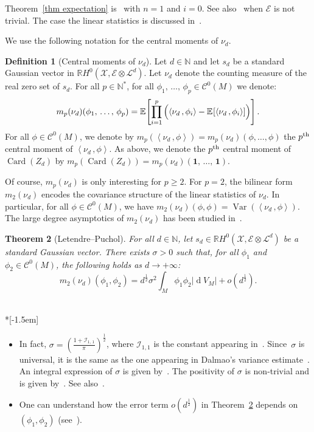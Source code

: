 \documentclass[10pt]{amsart}
\newtheorem{theo}{Theorem}[section]
\theoremstyle{definition}\newtheorem{defi}[theo]{Definition}\newtheorem{rema}[theo]{Remark}\newtheorem{exam}[theo]{Example}\newtheorem{exem}[theo]{Example}\newtheorem{nota}[theo]{Notation}
\DeclareMathOperator{\card}{Card}
\DeclareMathOperator{\dmesure}{d}
\DeclareMathOperator{\Var}{Var}
\newcommand{\E}{\mathcal{E}}
\newcommand{\I}{\mathcal{I}}
\newcommand{\X}{\mathcal{X}}
\renewcommand{\L}{\mathcal{L}}
\newcommand{\clC}{\mathcal{C}}
\newcommand{\N}{\mathbb{N}}
\newcommand{\R}{\mathbb{R}}
\newcommand{\bfun}{\mathbf{1}}
\newcommand{\esp}[2][]{\mathbb{E}_{#1}\!\left[#2 \right]}
\newcommand{\norm}[1]{\left\lvert #1 \right\rvert}
\newcommand{\prsc}[2]{\left\langle #1\,, #2 \right\rangle}
\newcommand{\rmes}[1]{\norm{\dmesure\! V_{#1}}}
\newcommand{\var}[1]{\Var\!\left(#1 \right)}
\renewcommand{\H}{H^0(\X,\E \otimes \L^d)}
\renewcommand{\geq}{\geqslant}
\begin{document}
Theorem~\ref{thm expectation} is~\cite[Theorem~1.2]{GW2016} with $n=1$ and $i=0$. See also~\cite[Theorem~1.3]{Let2016} when $\E$ is not trivial. The case the linear statistics is discussed in~\cite[Section~5.3]{Let2016}.

We use the following notation for the central moments of $\nu_d$.

\begin{defi}[{Central moments of $\nu_d$}]\label{def m p nu d}
Let $d \in \N$ and let $s_d$ be a standard Gaussian vector in $\R \H$. Let $\nu_d$ denote the counting measure of the real zero set of $s_d$. For all $p \in \N^*$, for all $\phi_1,\,\dots,\,\phi_p \in \clC^0(M)$ we denote:
\[
m_p(\nu_d)(\phi_1,\,\dots,\,\phi_p) = \esp{\prod_{i=1}^p \left(\prsc{\nu_d}{\phi_i}-\rule{0pt}{10pt}\esp{\prsc{\nu_d}{\phi_i}}\right)}.
\]
For all $\phi \in \clC^0(M)$, we denote by $m_p(\prsc{\nu_d}{\phi}) = m_p(\nu_d)(\phi,\dots,\phi)$ the $p^{\rm th}$ central moment of $\prsc{\nu_d}{\phi}$. As above, we denote the $p^{\rm th}$ central moment of $\card(Z_d)$ by $m_p(\card(Z_d)) = m_p(\nu_d)(\bfun,\,\dots,\,\bfun)$.
\end{defi}

Of course, $m_p(\nu_d)$ is only interesting for $p \geq 2$. For $p=2$, the bilinear form $m_2(\nu_d)$ encodes the covariance structure of the linear statistics of $\nu_d$. In particular, for all $\phi \in \clC^0(M)$, we have $m_2(\nu_d)(\phi,\phi) = \var{\prsc{\nu_d}{\phi}}$. The large degree asymptotics of $m_2(\nu_d)$ has been studied in~\cite[Theorem~1.6]{LP2019}.

\begin{theo}[{Letendre--Puchol}]\label{thm variance}
For all $d \in \N$, let $s_d \in \R\H$ be a standard Gaussian vector. There exists $\sigma >0$ such that, for all $\phi_1$ and $\phi_2 \in \clC^0(M)$, the following holds as $d \to +\infty$:
\[
m_2(\nu_d)(\phi_1,\phi_2) =d^\frac{1}{2} \sigma^2\int_M \phi_1 \phi_2 \rmes{M} + o\left(d^{\frac{1}{2}}\right).
\]
\end{theo}

\begin{remas}\label{rems thm variance}\ \\*[-1.5em]
\begin{itemize}
\item In fact, $\sigma = (\tfrac{1+\I_{1,\,1}}{\pi})^\frac{1}{2}$, where $\I_{1,1}$ is the constant appearing in~\cite[Theorem~1.6]{LP2019}. Since~$\sigma$ is universal, it is the same as the one appearing in Dalmao's variance estimate~\cite[Theorem~1.1]{Dal2015}. An integral expression of $\sigma$ is given by~\cite[Proposition~3.1]{Dal2015}. The positivity of $\sigma$ is non-trivial and is given by~\cite[Corollary~1.2]{Dal2015}. See also~\cite[Theorem~1.8]{LP2019}.
\item One can understand how the error term $o(d^{\frac{1}{2}})$ in Theorem~\ref{thm variance} depends on $(\phi_1,\phi_2)$ (see~\cite[Theorem~1.6]{LP2019}).
\end{itemize}
\end{remas}
\end{document}

